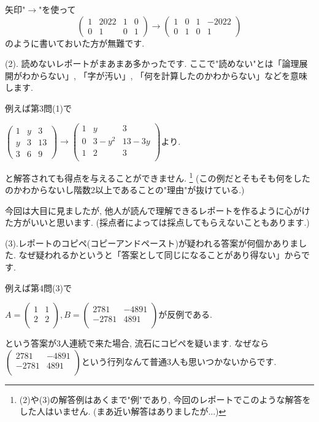 \documentclass[dvipdfmx,a4paper,11pt]{article}
\theoremstyle{definition}
\begin{document}
 矢印"$\rightarrow$"を使って
  $$
 \begin{pmatrix}
1& 2022 &1 & 0 \\
0& 1& 0& 1
 \end{pmatrix}
 \longrightarrow
  \begin{pmatrix}
1& 0 &1 & -2022 \\
0& 1& 0& 1
 \end{pmatrix}
 $$
 のように書いておいた方が無難です. 
 
 (2). 読めないレポートがまあまあ多かったです. ここで"読めない"とは「論理展開がわからない」, 「字が汚い」, 「何を計算したのかわからない」などを意味します.

例えば第3問(1)で

\begin{center}
$
\begin{pmatrix}
1 &y&3 \\
y & 3& 13\\
3&6 &9
 \end{pmatrix}
\rightarrow
 \begin{pmatrix}
1 &y&3 \\
0 & 3 - y^2& 13 - 3y\\
1&2  &3\\
 \end{pmatrix}$より.
\end{center}

と解答されても得点を与えることができません. \footnote{(2)や(3)の解答例はあくまで"例"であり, 今回のレポートでこのような解答をした人はいません. (まあ近い解答はありましたが...)}
(この例だとそもそも何をしたのかわからないし階数2以上であることの"理由"が抜けている.) 

今回は大目に見ましたが, 他人が読んで理解できるレポートを作るように心がけた方がいいと思います. (採点者によっては採点してもらえないこともあります.)

(3).レポートのコピペ(コピーアンドペースト)が疑われる答案が何個かありました. なぜ疑われるかというと「答案として同じになることがあり得ない」からです.

例えば第4問(3)で

\begin{center}
$A=
\begin{pmatrix}
1&1\\
2 &2\\
 \end{pmatrix},
B=
\begin{pmatrix}
2781& -4891\\
-2781 &4891 \\
 \end{pmatrix}
 $が反例である.
\end{center}
という答案が3人連続で来た場合, 流石にコピペを疑います. なぜなら$\begin{pmatrix}
2781& -4891\\
-2781 &4891 \\
 \end{pmatrix}$という行列なんて普通3人も思いつかないからです. 
\end{document}

